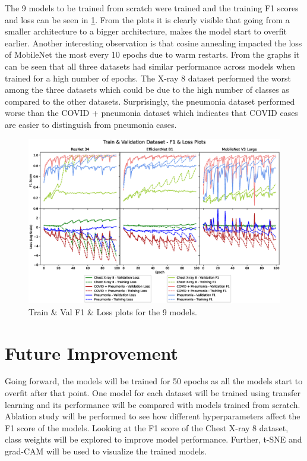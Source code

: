 \documentclass[10pt,twocolumn,letterpaper]{article}
\begin{document}
The 9 models to be trained from scratch were trained and the training F1 scores and loss can be seen in \cref{fig:acc_loss_sep}. From the plots it is clearly visible that going from a smaller architecture to a bigger architecture, makes the model start to overfit earlier. Another interesting observation is that cosine annealing impacted the loss of MobileNet the most every 10 epochs due to warm restarts. From the graphs it can be seen that all three datasets had similar performance across models when trained for a high number of epochs. The X-ray 8 dataset performed the worst among the three datasets which could be due to the high number of classes as compared to the other datasets. Surprisingly, the pneumonia dataset performed worse than the COVID + pneumonia dataset which indicates that COVID cases are easier to distinguish from pneumonia cases. 

\begin{figure}[t]
  \centering
  \includegraphics[width=1\linewidth]{f1_loss_separate.eps}  
   \caption{Train \& Val F1 \& Loss plots for the 9 models.}
   \vspace{-1.5em}
   \label{fig:acc_loss_sep}
\end{figure}

\section{Future Improvement}
\label{sec:future}
Going forward, the models will be trained for 50 epochs as all the models start to overfit after that point. One model for each dataset will be trained using transfer learning and its performance will be compared with models trained from scratch. Ablation study will be performed to see how different hyperparameters affect the F1 score of the models. Looking at the F1 score of the Chest X-ray 8 dataset, class weights will be explored to improve model performance. Further, t-SNE \cite{van2008visualizing} and grad-CAM \cite{jacobgilpytorchcam} will be used to visualize the trained models.

\clearpage
{\small


}
\end{document}

